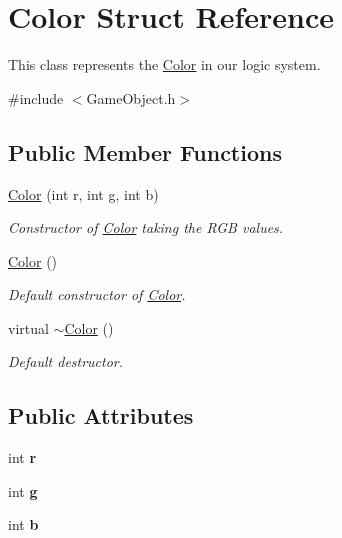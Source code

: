 \hypertarget{structColor}{}\section{Color Struct Reference}
\label{structColor}


This class represents the \hyperlink{structColor}{Color} in our logic system.  




{\ttfamily \#include $<$Game\+Object.\+h$>$}

\subsection*{Public Member Functions}
\begin{DoxyCompactItemize}
\item 
\hyperlink{structColor_a154354d16fc63294355979095a3b6d65}{Color} (int r, int g, int b)
\begin{DoxyCompactList}\small\item\em Constructor of \hyperlink{structColor}{Color} taking the R\+GB values. \end{DoxyCompactList}\item 
\mbox{\label{structColor_a9a742cbe9f9f4037f5d9f4e81a9b2428}} 
\hyperlink{structColor_a9a742cbe9f9f4037f5d9f4e81a9b2428}{Color} ()
\begin{DoxyCompactList}\small\item\em Default constructor of \hyperlink{structColor}{Color}. \end{DoxyCompactList}\item 
\mbox{\label{structColor_a3cfce6c6821d3bf489e26074c55378c0}} 
virtual \hyperlink{structColor_a3cfce6c6821d3bf489e26074c55378c0}{$\sim$\+Color} ()
\begin{DoxyCompactList}\small\item\em Default destructor. \end{DoxyCompactList}\end{DoxyCompactItemize}
\subsection*{Public Attributes}
\begin{DoxyCompactItemize}
\item 
\mbox{\label{structColor_a4954bdc9772da2a610401b8a438125cb}} 
int {\bfseries r}
\item 
\mbox{\label{structColor_ab5656e995bddd43d286c7ff5629a31dd}} 
int {\bfseries g}
\item 
\mbox{\label{structColor_ae11f00d34bf3ecd8c8278f68876b82bf}} 
int {\bfseries b}
\end{DoxyCompactItemize}


